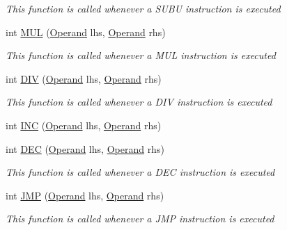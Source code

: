 \begin{DoxyCompactItemize}
\begin{DoxyCompactList}\small\item\em This function is called whenever a S\+U\+B\+U instruction is executed \end{DoxyCompactList}\item 
int \hyperlink{class_c_p_u___o_s___simulator_1_1_c_p_u_1_1_instruction_a46ba0e257c0a23f35b638cc774c016bd}{M\+U\+L} (\hyperlink{class_c_p_u___o_s___simulator_1_1_c_p_u_1_1_operand}{Operand} lhs, \hyperlink{class_c_p_u___o_s___simulator_1_1_c_p_u_1_1_operand}{Operand} rhs)
\begin{DoxyCompactList}\small\item\em This function is called whenever a M\+U\+L instruction is executed \end{DoxyCompactList}\item 
int \hyperlink{class_c_p_u___o_s___simulator_1_1_c_p_u_1_1_instruction_a45a29c12e7b55d4831705d13460df4a1}{D\+I\+V} (\hyperlink{class_c_p_u___o_s___simulator_1_1_c_p_u_1_1_operand}{Operand} lhs, \hyperlink{class_c_p_u___o_s___simulator_1_1_c_p_u_1_1_operand}{Operand} rhs)
\begin{DoxyCompactList}\small\item\em This function is called whenever a D\+I\+V instruction is executed \end{DoxyCompactList}\item 
int \hyperlink{class_c_p_u___o_s___simulator_1_1_c_p_u_1_1_instruction_a1fd4bf15c81941456405fd7a17ab2962}{I\+N\+C} (\hyperlink{class_c_p_u___o_s___simulator_1_1_c_p_u_1_1_operand}{Operand} lhs, \hyperlink{class_c_p_u___o_s___simulator_1_1_c_p_u_1_1_operand}{Operand} rhs)
\item 
int \hyperlink{class_c_p_u___o_s___simulator_1_1_c_p_u_1_1_instruction_a9cb36212a7cab42725d8a05f719e732f}{D\+E\+C} (\hyperlink{class_c_p_u___o_s___simulator_1_1_c_p_u_1_1_operand}{Operand} lhs, \hyperlink{class_c_p_u___o_s___simulator_1_1_c_p_u_1_1_operand}{Operand} rhs)
\begin{DoxyCompactList}\small\item\em This function is called whenever a D\+E\+C instruction is executed \end{DoxyCompactList}\item 
int \hyperlink{class_c_p_u___o_s___simulator_1_1_c_p_u_1_1_instruction_aa932e1a27222a151a6f9e60454a47e32}{J\+M\+P} (\hyperlink{class_c_p_u___o_s___simulator_1_1_c_p_u_1_1_operand}{Operand} lhs, \hyperlink{class_c_p_u___o_s___simulator_1_1_c_p_u_1_1_operand}{Operand} rhs)
\begin{DoxyCompactList}\small\item\em This function is called whenever a J\+M\+P instruction is executed \end{DoxyCompactList}\item 

\end{DoxyCompactItemize}
